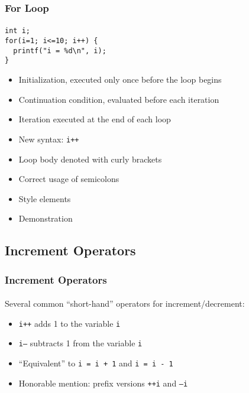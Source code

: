 \documentclass[]{beamer}
\begin{document}
\begin{frame}[fragile]
  \frametitle{For Loop}
  \framesubtitle{}
  
\begin{verbatim}
int i;
for(i=1; i<=10; i++) {
  printf("i = %d\n", i);
}  
\end{verbatim}

\begin{itemize}[<+(1)->]
  \item Initialization, executed only once before the loop begins
  \item Continuation condition, evaluated before each iteration
  \item Iteration executed at the end of each loop
  \item New syntax: \texttt{i++}
  \item Loop body denoted with curly brackets
  \item Correct usage of semicolons
  \item Style elements
  \item Demonstration %
\end{itemize}

\end{frame}


\subsection{Increment Operators}

\begin{frame}[fragile]
  \frametitle{Increment Operators}
  \framesubtitle{}

Several common ``short-hand'' operators for increment/decrement:  
\begin{itemize}[<+(1)->]
  \item \texttt{i++} adds 1 to the variable \texttt{i}
  \item \texttt{i--} subtracts 1 from the variable \texttt{i}
  \item ``Equivalent'' to \texttt{i = i + 1} and \texttt{i = i - 1}
  \item Honorable mention: prefix versions \texttt{++i} and \texttt{--i}  
\end{itemize}
\end{frame}
\end{document}
